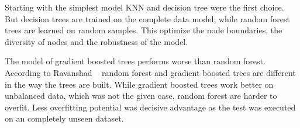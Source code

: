 Starting with the simplest model KNN and decision tree were the first choice. But decision trees are trained on the complete data model, while random forest trees are learned on random samples. This optimize the node boundaries, the diversity of nodes and the robustness of the model.  ~\cite{ref_towardsRFvsDecision}

The model of gradient boosted trees performs worse than random forest. According to Ravanshad ~\cite{ref_RFvsGBT} random forest and gradient boosted trees are different in the way the trees are built. While gradient boosted trees work better on unbalanced data, which was not the given case, random forest are harder to overfit. Less overfitting potential was decisive advantage as the test was executed on an completely unseen dataset.
